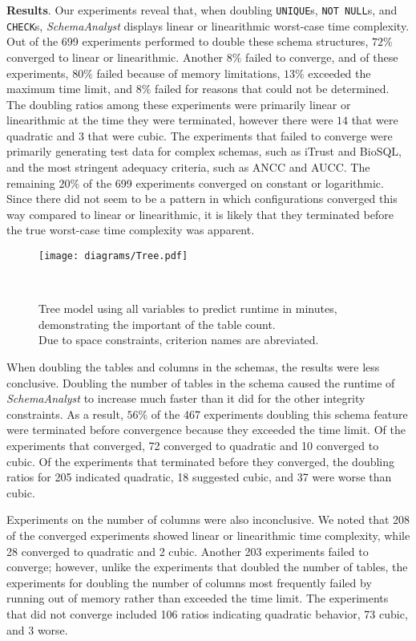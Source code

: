 
\textbf{Results}. Our experiments reveal that, when doubling \texttt{UNIQUE}s, {\tt NOT NULL}s, and {\tt CHECK}s,
\textit{SchemaAnalyst} displays linear or linearithmic worst-case time complexity.  Out of the 699 experiments performed
to double these schema structures, $72\%$ converged to linear or linearithmic.  Another $8\%$ failed to converge, and of
these experiments, $80\%$ failed because of memory limitations, $13\%$ exceeded the maximum time limit, and $8\%$ failed
for reasons that could not be determined.  The doubling ratios among these experiments were primarily linear or
linearithmic at the time they were terminated, however there were $14$ that were quadratic and $3$ that were cubic.  The
experiments that failed to converge were primarily generating test data for complex schemas, such as iTrust and BioSQL,
and the most stringent adequacy criteria, such as ANCC and AUCC. The remaining $20\%$ of the 699 experiments converged
on constant or logarithmic.  Since there did not seem to be a pattern in which configurations converged this way
compared to linear or linearithmic, it is likely that they terminated before the true worst-case time complexity was
apparent.

\begin{figure}[t]
\centering
  \centering
  \texttt{[image: diagrams/Tree.pdf]}
  \vspace*{-.25in}
  \caption{Tree model using all variables to predict runtime in minutes,
  demonstrating the important of the table count. \\ Due to space
  constraints, criterion names are abreviated.
  \vspace{-.35in}}~\label{fig:atree}
\end{figure}

When doubling the tables and columns in the schemas, the results were less conclusive. Doubling the number of tables in
the schema caused the runtime of \textit{SchemaAnalyst} to increase much faster than it did for the other integrity
constraints. As a result, $56\%$ of the 467 experiments doubling this schema feature were terminated before convergence
because they exceeded the time limit.  Of the experiments that converged, 72 converged to quadratic and 10 converged to
cubic.  Of the experiments that terminated before they converged, the doubling ratios for 205 indicated quadratic, 18
suggested cubic, and 37 were worse than cubic.

Experiments on the number of columns were also inconclusive.  We noted that 208 of the converged experiments showed
linear or linearithmic time complexity, while 28 converged to quadratic and 2 cubic.  Another 203 experiments failed to
converge; however, unlike the experiments that doubled the number of tables, the experiments for doubling the number of
columns most frequently failed by running out of memory rather than exceeded the time limit. The experiments that did not
converge included 106 ratios indicating quadratic behavior, 73 cubic, and 3 worse.


